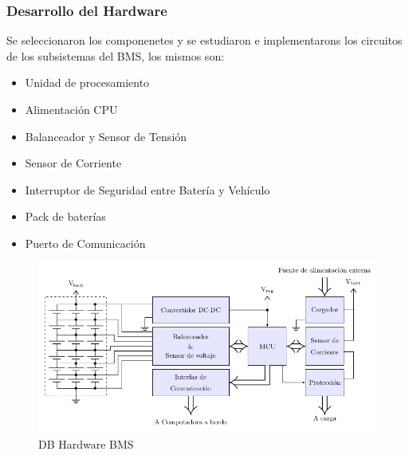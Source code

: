\documentclass[10pt]{beamer}
\theoremstyle{remark}
\theoremstyle{definition}
\begin{document}
\begin{frame}
	\frametitle{Desarrollo del Hardware}
    Se seleccionaron los componenetes y se estudiaron e implementarons los
    circuitos de los subsistemas del BMS, los mismos son:

  	\begin{minipage}{0.4\textwidth}
		\small
		\begin{itemize}
            \item Unidad de procesamiento
	  		\item Alimentaci\'on CPU
	  		\item Balanceador y Sensor de Tensi\'on
	 		\item Sensor de Corriente
		\end{itemize}
 	 \end{minipage}
  	\hfill
  	\begin{minipage}{0.4\textwidth}
		\small
		\begin{itemize}
            \item Interruptor de Seguridad entre Bater\'ia y Veh\'iculo
	  		\item Pack de bater\'ias
	 		\item Puerto de Comunicaci\'on
		\end{itemize}
  	\end{minipage}
  	\begin{figure}[h!]
	  		\centering
            \includegraphics[width=0.75\linewidth]{images/db_hardware.png}
	  		\caption{DB Hardware BMS}
  	\end{figure}
\end{frame}
\end{document}
